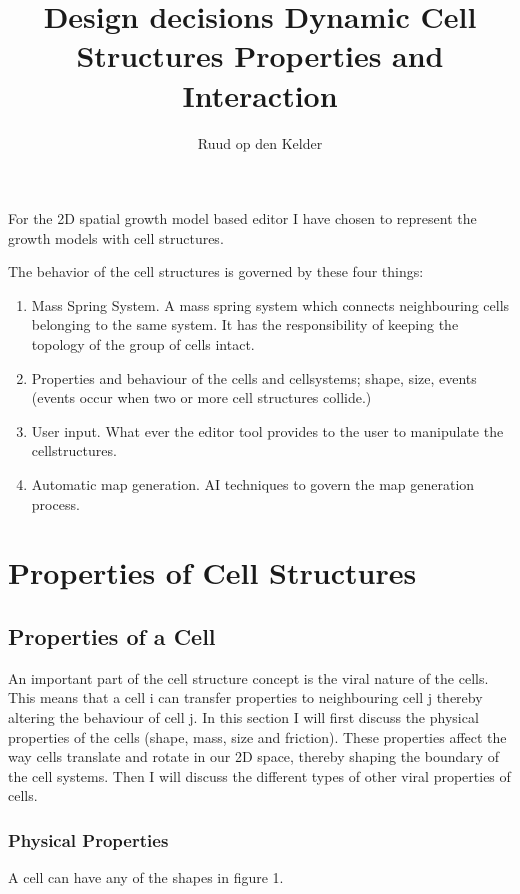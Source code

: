 \documentclass{article}
\title{Design decisions Dynamic Cell Structures \small{Properties and Interaction}}
\author{Ruud op den Kelder}
\begin{document}
\maketitle

For the 2D spatial growth model based editor I have chosen to represent the growth models with cell structures. 

The behavior of the cell structures is governed by these four things:  

\begin{enumerate}
\item Mass Spring System. A mass spring system which connects neighbouring cells belonging to the same system. It has the responsibility of keeping the topology of the group of cells intact.  
\item Properties and behaviour of the cells and cellsystems; shape, size, events (events occur when two or more cell structures collide.) 
\item User input. What ever the editor tool provides to the user to manipulate the cellstructures.
\item Automatic map generation. AI techniques to govern the map generation process.  
\end{enumerate}  

\section{Properties of Cell Structures}

\subsection{Properties of a Cell}
 
An important part of the cell structure concept is the viral nature of the cells. This means that a cell i can transfer properties to neighbouring cell j thereby altering the behaviour of cell j. In this section I will first discuss the physical properties of the cells (shape, mass, size and friction). These properties affect the way cells translate and rotate in our 2D space, thereby shaping the boundary of the cell systems. Then I will discuss the different types of other viral properties of cells.    


\subsubsection{Physical Properties}
A cell can have any of the shapes in figure 1.
\end{document}
